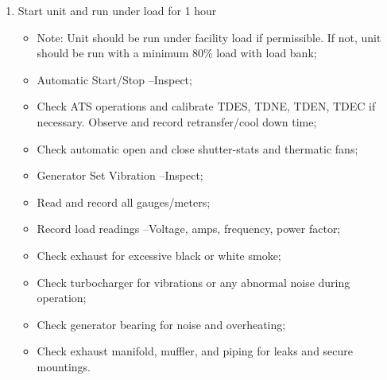 \begin{enumerate}[label=(\alph*)]
\item Start unit and run under load for 1 hour

\begin{itemize}
\item Note: Unit should be run under facility load if permissible.  If not, unit should be run with a minimum 80\% load with load bank;
\item Automatic Start/Stop –Inspect;
\item Check ATS operations and calibrate TDES, TDNE, TDEN, TDEC if necessary.  Observe and record retransfer/cool down time;
\item Check automatic open and close shutter-stats and thermatic fans;
\item Generator Set Vibration –Inspect;
\item Read and record all gauges/meters;
\item Record load readings –Voltage, amps, frequency, power factor;
\item Check exhaust for excessive black or white smoke;
\item Check turbocharger for vibrations or any abnormal noise during operation;
\item Check generator bearing for noise and overheating; 
\item Check exhaust manifold, muffler, and piping for leaks and secure mountings.

\end{itemize}


\end{enumerate}


